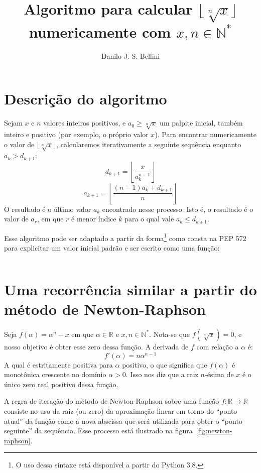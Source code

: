 \documentclass{article}
\title{Algoritmo para calcular $\lfloor \sqrt[n]{x} \rfloor$
       numericamente com $x, n \in \mathds{N}^*$}
\author{Danilo J. S. Bellini}
\begin{document}
\maketitle




\section*{Descrição do algoritmo}

Sejam $x$ e $n$ valores inteiros positivos,
e $a_0 \ge \sqrt[n]{x}$ um palpite inicial, também inteiro e positivo
(por exemplo, o próprio valor $x$).
Para encontrar numericamente o valor de $\lfloor \sqrt[n]{x} \rfloor$,
calcularemos iterativamente a seguinte sequência
enquanto $a_k > d_{k+1}$:
\[d_{k+1} = \left\lfloor \dfrac{x}{a_k^{n-1}} \right\rfloor\]
\[a_{k+1} = \left\lfloor \dfrac{(n-1) a_k + d_{k+1}}{n} \right\rfloor\]
O resultado é o último valor $a_k$ encontrado nesse processo.
Isto é, o resultado é o valor de $a_r$,
em que $r$ é menor índice $k$ para o qual vale $a_k \le d_{k+1}$.

Esse algoritmo pode ser adaptado
a partir da forma\footnote{
  O uso dessa sintaxe está disponível a partir do Python 3.8.
} como consta na PEP 572
para explicitar um valor inicial padrão e ser escrito como uma função:

\begin{center}
  \begin{minipage}{7cm}
    \inputminted{python}{nth_root.py}
  \end{minipage}
\end{center}


\section*{Uma recorrência similar a partir do método de Newton-Raphson}

Seja $f(\alpha) = \alpha^n - x$
em que $\alpha \in \mathds{R}$ e $x, n \in \mathds{N}^*$.
Nota-se que $f(\sqrt[n]{x}) = 0$,
e nosso objetivo é obter esse zero dessa função.
A derivada de $f$ com relação a $\alpha$ é:
\[f'(\alpha) = n \alpha^{n-1}\]
A qual é estritamente positiva para $\alpha$ positivo,
o que significa que $f(\alpha)$ é monotônica crescente
no domínio $\alpha > 0$.
Isso nos diz que a raiz $n$-ésima de $x$
é o único zero real positivo dessa função.

A regra de iteração do método de Newton-Raphson
sobre uma função $f:\mathds{R}\to\mathds{R}$
consiste no uso da raiz (ou zero)
da aproximação linear em torno do ``ponto atual'' da função
como a nova abscissa que será utilizada
para obter o ``ponto seguinte'' da sequência.
Esse processo está ilustrado na figura~\ref{fig:newton-raphson}.
\end{document}
